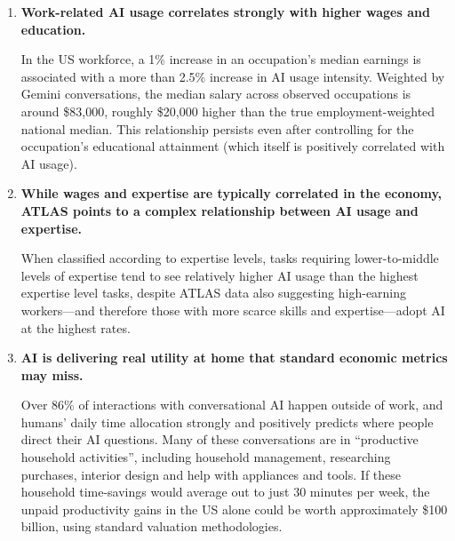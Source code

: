 \documentclass[11pt,a4paper]{article}
\begin{document}
\begin{enumerate}
    While nearly a third of heavily physical occupations show no observed AI usage, workers in many manual and technical trades are using AI on the job. In these roles, AI frequently acts as a hands-on collaborator for diagnostics, troubleshooting, and real-time learning. We also observe disproportionate multimodal use of AI (i.e., uses that involve images and video) in these contexts: for example, automotive technicians and industrial mechanics using AI to interpret complex test results, debug electrical wiring, and inspect machinery for wear, where the usage rate of multimodal AI is more than 2 times higher than the overall work baseline.

    \item \textbf{Work-related AI usage correlates strongly with higher wages and education.} 
    
    In the US workforce, a 1\% increase in an occupation's median earnings is associated with a more than 2.5\% increase in AI usage intensity. Weighted by Gemini conversations, the median salary across observed occupations is around \$83,000, roughly \$20,000 higher than the true employment-weighted national median. This relationship persists even after controlling for the occupation's educational attainment (which itself is positively correlated with AI usage).

    \item \textbf{While wages and expertise are typically correlated in the economy, ATLAS points to a complex relationship between AI usage and expertise.} 
    
    When classified according to expertise levels, tasks requiring lower-to-middle levels of expertise tend to see relatively higher AI usage than the highest expertise level tasks, despite ATLAS data also suggesting high-earning workers---and therefore those with more scarce skills and expertise---adopt AI at the highest rates.

    \item \textbf{AI is delivering real utility at home that standard economic metrics may miss.} 
    
    Over 86\% of interactions with conversational AI happen outside of work, and humans' daily time allocation strongly and positively predicts where people direct their AI questions. Many of these conversations are in ``productive household activities'', including household management, researching purchases, interior design and help with appliances and tools. If these household time-savings would average out to just 30 minutes per week, the unpaid productivity gains in the US alone could be worth approximately \$100 billion, using standard valuation methodologies.


\end{enumerate}
\end{document}
